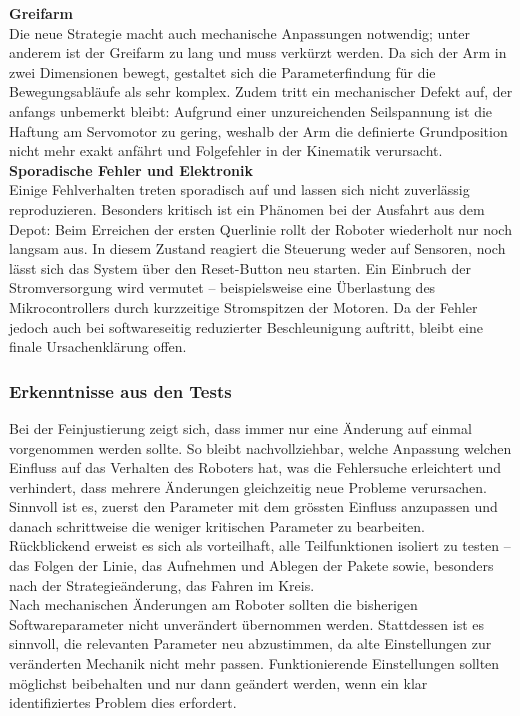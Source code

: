 \documentclass[11pt,a4paper]{article}
\begin{document}
	\noindent
	\textbf{Greifarm}\\
	Die neue Strategie macht auch mechanische Anpassungen notwendig; unter anderem ist der Greifarm zu lang und muss verkürzt werden. Da sich der Arm in zwei Dimensionen bewegt, gestaltet sich die Parameterfindung für die Bewegungsabläufe als sehr komplex. Zudem tritt ein mechanischer Defekt auf, der anfangs unbemerkt bleibt: Aufgrund einer unzureichenden Seilspannung ist die Haftung am Servomotor zu gering, weshalb der Arm die definierte Grundposition nicht mehr exakt anfährt und Folgefehler in der Kinematik verursacht.\\
	
	\noindent
	\textbf{Sporadische Fehler und Elektronik}\\
	Einige Fehlverhalten treten sporadisch auf und lassen sich nicht zuverlässig reproduzieren. Besonders kritisch ist ein Phänomen bei der Ausfahrt aus dem Depot: Beim Erreichen der ersten Querlinie rollt der Roboter wiederholt nur noch langsam aus. In diesem Zustand reagiert die Steuerung weder auf Sensoren, noch lässt sich das System über den Reset-Button neu starten. Ein Einbruch der Stromversorgung wird vermutet -- beispielsweise eine Überlastung des Mikrocontrollers durch kurzzeitige Stromspitzen der Motoren. Da der Fehler jedoch auch bei softwareseitig reduzierter Beschleunigung auftritt, bleibt eine finale Ursachenklärung offen.
	
	\subsubsection{Erkenntnisse aus den Tests}
	
	Bei der Feinjustierung zeigt sich, dass immer nur eine Änderung auf einmal vorgenommen werden sollte. So bleibt nachvollziehbar, welche Anpassung welchen Einfluss auf das Verhalten des Roboters hat, was die Fehlersuche erleichtert und verhindert, dass mehrere Änderungen gleichzeitig neue Probleme verursachen. Sinnvoll ist es, zuerst den Parameter mit dem grössten Einfluss anzupassen und danach schrittweise die weniger kritischen Parameter zu bearbeiten.\\
	
	\noindent
	Rückblickend erweist es sich als vorteilhaft, alle Teilfunktionen isoliert zu testen -- das Folgen der Linie, das Aufnehmen und Ablegen der Pakete sowie, besonders nach der Strategieänderung, das Fahren im Kreis.\\
	
	\noindent
	Nach mechanischen Änderungen am Roboter sollten die bisherigen Softwareparameter nicht unverändert übernommen werden. Stattdessen ist es sinnvoll, die relevanten Parameter neu abzustimmen, da alte Einstellungen zur veränderten Mechanik nicht mehr passen. Funktionierende Einstellungen sollten möglichst beibehalten und nur dann geändert werden, wenn ein klar identifiziertes Problem dies erfordert.\\
	
\end{document}
